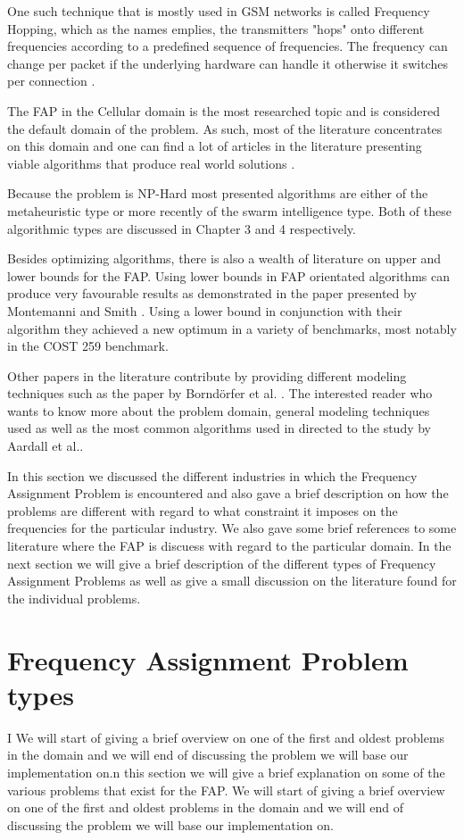 One such technique that is mostly used in GSM networks is called Frequency Hopping, which as the names emplies, the transmitters "hops" onto different frequencies according to a predefined sequence of frequencies. The frequency can change per packet if the underlying hardware can handle it otherwise it switches per connection \cite{Karen2004,MontemanniThesis,Eisenblatter}.

The FAP in the Cellular domain is the most researched topic and is considered the default domain of the problem. As such, most of the literature concentrates on this domain and one can find a lot of articles in the literature presenting viable algorithms that produce real world solutions \cite{Eisenblatter}. 

Because the problem is NP-Hard most presented algorithms are either of the metaheuristic type or more recently of the swarm intelligence type. Both of these algorithmic types are discussed in Chapter 3 and 4 respectively.

Besides optimizing algorithms, there is also a wealth of literature on upper and lower bounds for the FAP. Using lower bounds in FAP orientated algorithms can produce very favourable results as demonstrated in the paper presented by Montemanni and Smith \cite{TabuMontemanniSmith}. Using a lower bound in conjunction with their algorithm they achieved a new optimum in a variety of benchmarks, most notably in the COST 259 benchmark. 

Other papers in the literature contribute by providing different modeling techniques such as the paper by Borndörfer et al. \cite{FAPOrientationModel}. The interested reader who wants to know more about the problem domain, general modeling techniques used as well as the most common algorithms used in directed to the study by Aardall et al.\cite{Karen2004}.

In this section we discussed the different industries in which the Frequency Assignment Problem is encountered and also gave a brief description on how the problems are different with regard to what constraint it imposes on the frequencies for the particular industry. 
We also gave some brief references to some literature where the FAP is discuess with regard to the particular domain. In the next section we will give a brief description of the different types of Frequency Assignment Problems as well as give a small discussion on the literature found for the individual problems.
\section{Frequency Assignment Problem types}
\label{sec:FAPVariants}
I We will start of giving a brief overview on one of the first and oldest problems in the domain and we  will end of discussing the problem we will base our implementation on.n this section we will give a brief explanation on some of the various problems that exist for the FAP. We will start of giving a brief overview on one of the first and oldest problems in the domain and we  will end of discussing the problem we will base our implementation on.
